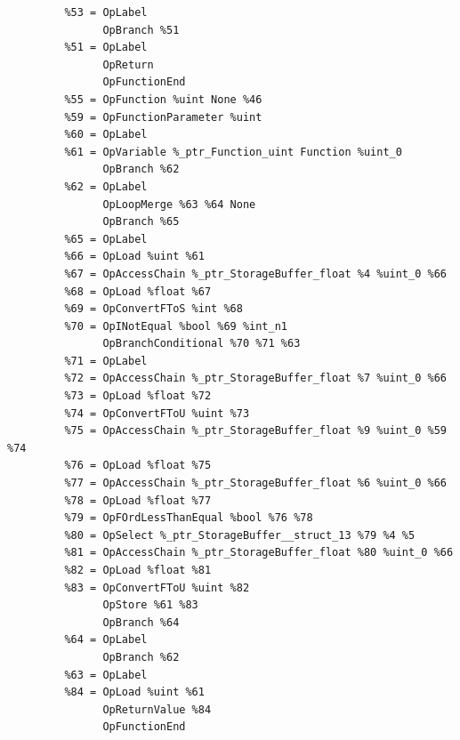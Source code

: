 \documentclass{IEEEtran}
\begin{document}
\begin{lstlisting}
         %53 = OpLabel
               OpBranch %51
         %51 = OpLabel
               OpReturn
               OpFunctionEnd
         %55 = OpFunction %uint None %46
         %59 = OpFunctionParameter %uint
         %60 = OpLabel
         %61 = OpVariable %_ptr_Function_uint Function %uint_0
               OpBranch %62
         %62 = OpLabel
               OpLoopMerge %63 %64 None
               OpBranch %65
         %65 = OpLabel
         %66 = OpLoad %uint %61
         %67 = OpAccessChain %_ptr_StorageBuffer_float %4 %uint_0 %66
         %68 = OpLoad %float %67
         %69 = OpConvertFToS %int %68
         %70 = OpINotEqual %bool %69 %int_n1
               OpBranchConditional %70 %71 %63
         %71 = OpLabel
         %72 = OpAccessChain %_ptr_StorageBuffer_float %7 %uint_0 %66
         %73 = OpLoad %float %72
         %74 = OpConvertFToU %uint %73
         %75 = OpAccessChain %_ptr_StorageBuffer_float %9 %uint_0 %59 %74
         %76 = OpLoad %float %75
         %77 = OpAccessChain %_ptr_StorageBuffer_float %6 %uint_0 %66
         %78 = OpLoad %float %77
         %79 = OpFOrdLessThanEqual %bool %76 %78
         %80 = OpSelect %_ptr_StorageBuffer__struct_13 %79 %4 %5
         %81 = OpAccessChain %_ptr_StorageBuffer_float %80 %uint_0 %66
         %82 = OpLoad %float %81
         %83 = OpConvertFToU %uint %82
               OpStore %61 %83
               OpBranch %64
         %64 = OpLabel
               OpBranch %62
         %63 = OpLabel
         %84 = OpLoad %uint %61
               OpReturnValue %84
               OpFunctionEnd
\end{lstlisting}
\end{document}
